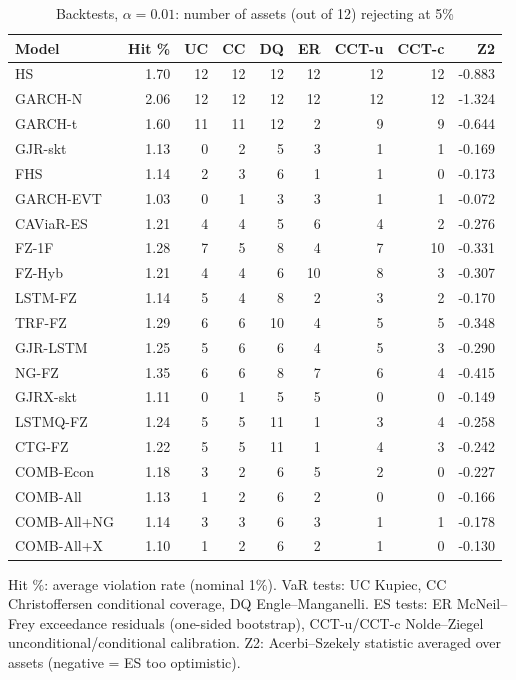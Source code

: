 \begin{table}[htbp]
\centering
\footnotesize
\caption{Backtests, $\alpha=0.01$: number of assets (out of 12) rejecting at 5\%}
\label{tab:bt_a010}
\begin{tabular}{lrrrrrrrr}
\toprule
Model & Hit \% & UC & CC & DQ & ER & CCT-u & CCT-c & Z2 \\
\midrule
HS & 1.70 & 12 & 12 & 12 & 12 & 12 & 12 & -0.883 \\
GARCH-N & 2.06 & 12 & 12 & 12 & 12 & 12 & 12 & -1.324 \\
GARCH-t & 1.60 & 11 & 11 & 12 & 2 & 9 & 9 & -0.644 \\
GJR-skt & 1.13 & 0 & 2 & 5 & 3 & 1 & 1 & -0.169 \\
FHS & 1.14 & 2 & 3 & 6 & 1 & 1 & 0 & -0.173 \\
GARCH-EVT & 1.03 & 0 & 1 & 3 & 3 & 1 & 1 & -0.072 \\
CAViaR-ES & 1.21 & 4 & 4 & 5 & 6 & 4 & 2 & -0.276 \\
FZ-1F & 1.28 & 7 & 5 & 8 & 4 & 7 & 10 & -0.331 \\
FZ-Hyb & 1.21 & 4 & 4 & 6 & 10 & 8 & 3 & -0.307 \\
LSTM-FZ & 1.14 & 5 & 4 & 8 & 2 & 3 & 2 & -0.170 \\
TRF-FZ & 1.29 & 6 & 6 & 10 & 4 & 5 & 5 & -0.348 \\
GJR-LSTM & 1.25 & 5 & 6 & 6 & 4 & 5 & 3 & -0.290 \\
NG-FZ & 1.35 & 6 & 6 & 8 & 7 & 6 & 4 & -0.415 \\
GJRX-skt & 1.11 & 0 & 1 & 5 & 5 & 0 & 0 & -0.149 \\
LSTMQ-FZ & 1.24 & 5 & 5 & 11 & 1 & 3 & 4 & -0.258 \\
CTG-FZ & 1.22 & 5 & 5 & 11 & 1 & 4 & 3 & -0.242 \\
COMB-Econ & 1.18 & 3 & 2 & 6 & 5 & 2 & 0 & -0.227 \\
COMB-All & 1.13 & 1 & 2 & 6 & 2 & 0 & 0 & -0.166 \\
COMB-All+NG & 1.14 & 3 & 3 & 6 & 3 & 1 & 1 & -0.178 \\
COMB-All+X & 1.10 & 1 & 2 & 6 & 2 & 1 & 0 & -0.130 \\
\bottomrule
\end{tabular}
\par\smallskip\parbox{\linewidth}{\scriptsize Hit \%: average violation rate (nominal 1\%). VaR tests: UC Kupiec, CC Christoffersen conditional coverage, DQ Engle--Manganelli. ES tests: ER McNeil--Frey exceedance residuals (one-sided bootstrap), CCT-u/CCT-c Nolde--Ziegel unconditional/conditional calibration. Z2: Acerbi--Szekely statistic averaged over assets (negative = ES too optimistic).}
\end{table}